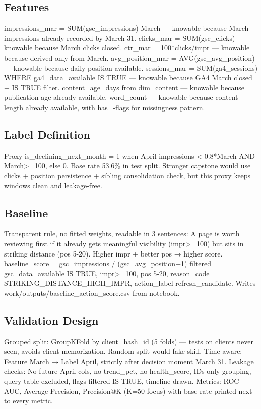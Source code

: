 \documentclass[conference]{IEEEtran}
\begin{document}
\subsection{Features}
impressions\_mar = SUM(gsc\_impressions) March — knowable because March impressions already recorded by March 31. clicks\_mar = SUM(gsc\_clicks) — knowable because March clicks closed. ctr\_mar = 100*clicks/impr — knowable because derived only from March. avg\_position\_mar = AVG(gsc\_avg\_position) — knowable because daily position available. sessions\_mar = SUM(ga4\_sessions) WHERE ga4\_data\_available IS TRUE — knowable because GA4 March closed + IS TRUE filter. content\_age\_days from dim\_content — knowable because publication age already available. word\_count — knowable because content length already available, with has\_-flags for missingness pattern.

\subsection{Label Definition}
Proxy is\_declining\_next\_month = 1 when April impressions < 0.8*March AND March>=100, else 0. Base rate 53.6\% in test split. Stronger capstone would use clicks + position persistence + sibling consolidation check, but this proxy keeps windows clean and leakage-free.

\subsection{Baseline}
Transparent rule, no fitted weights, readable in 3 sentences: A page is worth reviewing first if it already gets meaningful visibility (impr>=100) but sits in striking distance (pos 5-20). Higher impr + better pos → higher score. baseline\_score = gsc\_impressions / (gsc\_avg\_position+1) filtered gsc\_data\_available IS TRUE, impr>=100, pos 5-20, reason\_code STRIKING\_DISTANCE\_HIGH\_IMPR, action\_label refresh\_candidate. Writes work/outputs/baseline\_action\_score.csv from notebook.

\subsection{Validation Design}
Grouped split: GroupKFold by client\_hash\_id (5 folds) — tests on clients never seen, avoids client-memorization. Random split would fake skill. Time-aware: Feature March → Label April, strictly after decision moment March 31. Leakage checks: No future April cols, no trend\_pct, no health\_score, IDs only grouping, query table excluded, flags filtered IS TRUE, timeline drawn. Metrics: ROC AUC, Average Precision, Precision@K (K=50 focus) with base rate printed next to every metric.
\end{document}
